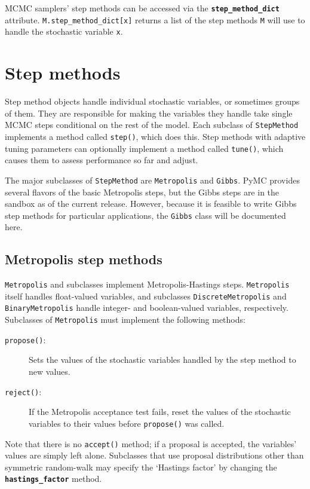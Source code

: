 MCMC samplers' step methods can be accessed via the \texttt{\textbf{step_method_dict}} attribute. \texttt{M.step_method_dict[x]} returns a list of the step methods \texttt{M} will use to handle the stochastic variable \texttt{x}.


\hypertarget{step-method}{}
\section*{Step methods} \label{sec:stepmethod}


Step method objects handle individual stochastic variables, or sometimes groups of them. They are responsible for making the variables they handle take single MCMC steps conditional on the rest of the model. Each subclass of \texttt{StepMethod} implements a method called \texttt{step()}, which does this. Step methods with adaptive tuning parameters can optionally implement a method called \texttt{tune()}, which causes them to assess performance so far and adjust.

The major subclasses of \texttt{StepMethod} are \texttt{Metropolis} and \texttt{Gibbs}. PyMC provides several flavors of the basic Metropolis steps, but the Gibbs steps are in the sandbox as of the current release. However, because it is feasible to write Gibbs step methods for particular applications, the \texttt{Gibbs} class will be documented here.

\hypertarget{metropolis}{}
\subsection*{Metropolis step methods} \label{metropolis}

\texttt{Metropolis} and subclasses implement Metropolis-Hastings steps. \texttt{Metropolis} itself handles float-valued variables, and subclasses \texttt{DiscreteMetropolis} and \texttt{BinaryMetropolis} handle integer- and boolean-valued variables, respectively. Subclasses of \texttt{Metropolis} must implement the following methods:
\begin{description}
    \item[\texttt{propose()}:] Sets the values of the stochastic variables handled by the step method to new values.
    \item[\texttt{reject()}:] If the Metropolis acceptance test fails, reset the values of the stochastic variables to their values before \texttt{propose()} was called.
\end{description}
Note that there is no \texttt{accept()} method; if a proposal is accepted, the variables' values are simply left alone. Subclasses that use proposal distributions other than symmetric random-walk may specify the `Hastings factor' by changing the \textbf{\texttt{hastings_factor}} method.


